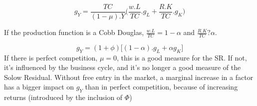 \begin{equation*}
    g_{Y}=\frac{TC}{(1-\mu).Y}\bigg( \frac{w.L}{TC}.g_{L}+\frac{R.K}{TC}.g_{K}\bigg)
\end{equation*}

If the production function is a Cobb Douglas, $\frac{w.L}{TC}=1-\alpha$ and $\frac{R.K}{TC}?\alpha$. 

\begin{equation*}
    g_{Y}=(1+\phi)\big[ (1-\alpha).g_{L}+\alpha g_{K} \big]
\end{equation*}
If there is perfect competition, $\mu=0$, this is a good measure for the SR. If not, it's influenced by the business cycle, and it's no longer a good measure of the Solow Residual. 
\newline
Without free entry in the market, a marginal increase in a factor has a bigger impact on $g_{Y}$ than in perfect competition, because of increasing returns (introduced by the inclusion of $\Phi$)







